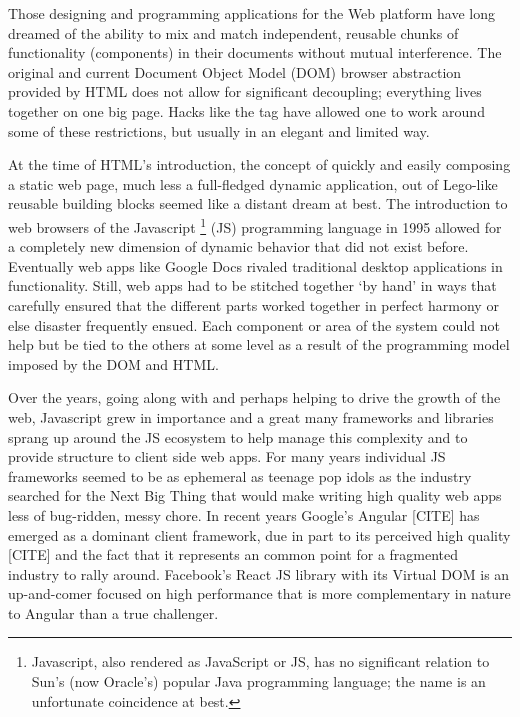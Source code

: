 Those designing and programming applications for the Web platform have long dreamed of the ability to mix and match independent, reusable chunks of functionality (components) in their documents without mutual interference. 
The original and current Document Object Model (DOM)
browser abstraction provided by HTML does not allow for significant decoupling; 
everything lives together on one big page. Hacks like the 
tag have allowed one to work around some of these restrictions, 
but usually in an elegant and limited way.

At the time of HTML's introduction, 
the concept of quickly and easily composing a static web page, 
much less a full-fledged dynamic application, 
out of Lego-like reusable building blocks seemed like a distant dream at best. 
The introduction to web browsers of the Javascript
\footnote[1]{Javascript, also rendered as JavaScript or JS, 
has no significant relation to Sun's (now Oracle's) popular Java programming language;
the name is an unfortunate coincidence at best.}
(JS) programming language in 1995 allowed for a completely new dimension of dynamic behavior that did not exist before.
Eventually web apps like Google Docs rivaled traditional desktop applications in functionality.
Still, web apps had to be stitched together `by hand' in ways that carefully ensured that the different parts worked together in perfect harmony or else disaster frequently ensued. 
Each component or area of the system could not help but be tied to the others at some level as a result of the programming model imposed by the DOM and HTML.

Over the years, going along with and perhaps helping to drive the growth of the web, 
Javascript grew in importance and a great many frameworks and libraries sprang up around the JS ecosystem to help manage this complexity and to provide structure to client side web apps.
For many years individual JS frameworks seemed to be as ephemeral as teenage pop idols as the industry searched for the Next Big Thing that would make writing high quality web apps less of bug-ridden, messy chore. 
In recent years Google's Angular [CITE] 
has emerged as a dominant client framework, 
due in part to its perceived high quality [CITE] and the fact that it represents an common point for a fragmented industry to rally around.
Facebook's React 
JS library with its Virtual DOM is an up-and-comer focused on high performance that is more complementary in nature to Angular than a true challenger.

